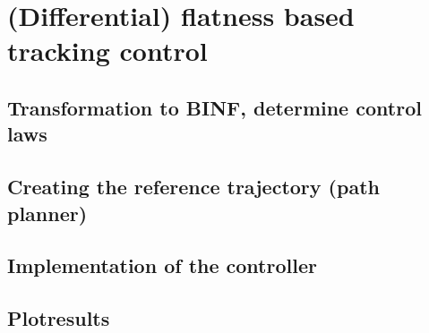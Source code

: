 \documentclass[a4paper,11pt,headings=standardclasses]{scrartcl}%
\begin{document}
\section{(Differential) flatness based tracking control}
\subsection{Transformation to BINF, determine control laws}
\subsection{Creating the reference trajectory (path planner)}
\subsection{Implementation of the controller}
\subsection{Plotresults}
\end{document}
